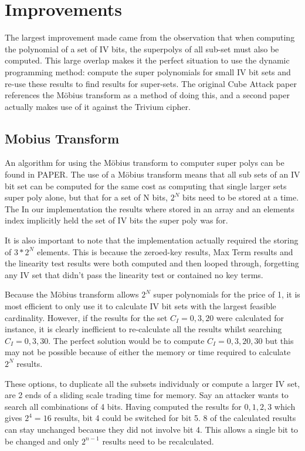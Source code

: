 \documentclass{report}
\let\Oldsection\section
\renewcommand{\section}{\FloatBarrier\Oldsection}
\let\Oldsubsection\subsection
\renewcommand{\subsection}{\FloatBarrier\Oldsubsection}
\begin{document}
\section{Improvements}
The largest improvement made came from the observation that when computing the polynomial of a set of IV bits, the superpolys of all sub-set must also be computed. This large overlap makes it the perfect situation to use the dynamic programming method: compute the super polynomials for small IV bit sets and re-use these results to find results for super-sets. The original Cube Attack paper references the Möbius transform as a method of doing this, and a second paper %
actually makes use of it against the Trivium cipher. %
\subsection{Mobius Transform}
An algorithm for using the Möbius transform to computer super polys can be found in PAPER.
The use of a Möbius transform means that all sub sets of an IV bit set can be computed for the same cost as computing that single larger sets super poly alone, but that for a set of N bits, $2^N$ bits need to be stored at a time. The In our implementation the results where stored in an array and an elements index implicitly held the set of IV bits the super poly was for.%

It is also important to note that the implementation actually required the storing of $3*2^N$ elements. This is because the zeroed-key results, Max Term results and the linearity test results were both computed and then looped through, forgetting any IV set that didn't pass the linearity test or contained no key terms.

Because the Möbius transform allows $2^N$ super polynomials for the price of 1, it is most efficient to only use it to calculate IV bit sets with the largest feasible cardinality. However, if the results for the set $C_I={0,3,20}$ were calculated for instance, it is clearly inefficient to re-calculate all the results whilst searching $C_I={0,3,30}$. The perfect solution would be to compute $C_I={0,3,20,30}$ but this may not be possible because of either the memory or time required to calculate $2^N$ results.

These options, to duplicate all the subsets individualy or compute a larger IV set, are 2 ends of a sliding scale trading time for memory. Say an attacker wants to search all combinations of 4 bits. Having computed the results for ${0,1,2,3}$ which gives $2^4=16$ results, bit 4 could be switched for bit 5. 8 of the calculated results can stay unchanged because they did not involve bit 4. This allows a single bit to be changed and only $2^{n-1}$ results need to be recalculated.
\end{document}
